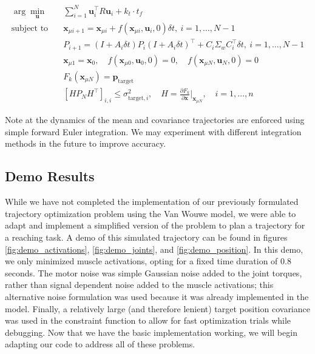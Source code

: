 \documentclass[table,12pt]{article}
\begin{document}
\begin{align}
    \arg\min_{\mathbf{u}} &\quad \sum_{i=1}^{N} \mathbf{u}_i^\top R \mathbf{u}_i + k_t \cdot t_f \label{eq:dcost} \\
    \text{subject to} &\quad \mathbf{x}_{\mu i+1} = \mathbf{x}_{\mu i} + f(\mathbf{x}_{\mu i}, \mathbf{u}_i, 0) \delta t, \ i = 1, \dots, N-1 \\
    &\quad P_{i+1} = (I + A_i \delta t)P_i(I + A_i \delta t)^\top + C_i \Sigma_w C_i^\top \delta t, \ i = 1, \dots, N-1 \\
    &\quad \mathbf{x}_{\mu 1} = \mathbf{x}_0, \quad f(\mathbf{x}_{\mu 0}, \mathbf{u}_0, 0) = 0, \quad f(\mathbf{x}_{\mu N}, \mathbf{u}_N, 0) = 0 \label{eq:dboundary_constraints} \\
    &\quad F_k(\mathbf{x}_{\mu N}) = \mathbf{p}_{\text{target}} \label{eq:dtarget_constraint} \\
    &\quad [HP_NH^\top]_{i,i} \leq \sigma_{\text{target}, i}^2, \quad H = \frac{\partial F_k}{\partial \mathbf{x}}\bigg|_{\mathbf{x}_{\mu N}}, \quad i = 1, \ldots, n \label{eq:dtarget_variance_constraint}
\end{align}

Note at the dynamics of the mean and covariance trajectories are enforced using simple forward Euler integration. We may experiment with different integration methods in the future to improve accuracy.

\subsection{Demo Results}

While we have not completed the implementation of our previously formulated trajectory optimization problem using the Van Wouwe model, we were able to adapt and implement a simplified version of the problem to plan a trajectory for a reaching task. A demo of this simulated trajectory can be found in figures \ref{fig:demo_activations}, \ref{fig:demo_joints}, and \ref{fig:demo_position}. In this demo, we only minimized muscle activations, opting for a fixed time duration of 0.8 seconds. The motor noise was simple Gaussian noise added to the joint torques, rather than signal dependent noise added to the muscle activations; this alternative noise formulation was used because it was already implemented in the model. Finally, a relatively large (and therefore lenient) target position covariance was used in the constraint function to allow for fast optimization trials while debugging. Now that we have the basic implementation working, we will begin adapting our code to address all of these problems.
\end{document}
